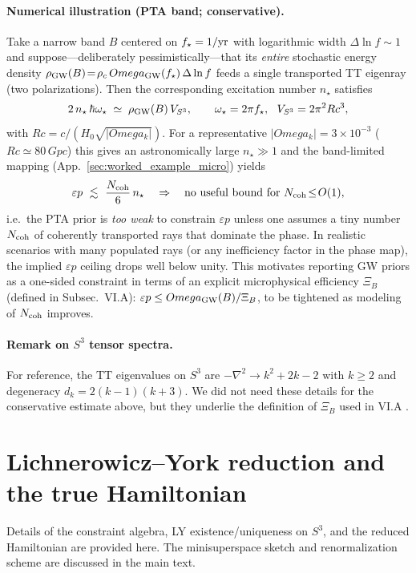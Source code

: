 \documentclass[aps,prd,twocolumn,amsmath,amssymb,nofootinbib,superscriptaddress]{revtex4-2}
\def\mathcal#1{#1}%
\def\mathrm#1{#1}%
\def\Rc{Rc}%
\def\Omega{Omega}\def\sigma{sigma}\def\chi{chi}\def\ell{ell}%
\newcommand{\Rc}{\mathcal{R}_c}
\begin{document}
\paragraph*{Numerical illustration (PTA band; conservative).}
Take a narrow band $B$ centered on $f_\star=1/{\rm yr}$ with logarithmic width $\Delta\ln f\sim 1$ and suppose---deliberately pessimistically---that its \emph{entire} stochastic energy density $\rho_{\rm GW}(B)\!=\!\rho_c \,\Omega_{\rm GW}(f_\star)\,\Delta\ln f$ feeds a single transported TT eigenray (two polarizations). Then the corresponding excitation number $n_\star$ satisfies
\[
  2\,n_\star\,\hbar\omega_\star \;\simeq\; \rho_{\rm GW}(B)\,V_{S^3},\qquad
  \omega_\star=2\pi f_\star,\ \ V_{S^3}=2\pi^2\Rc^3,
\]
with $\Rc=c/(H_0\sqrt{|\Omega_k|})$. For a representative $|\Omega_k|=3\times10^{-3}$ ($\Rc\simeq 80\,\mathrm{Gpc}$) this gives an astronomically large $n_\star\!\gg\!1$ and the band-limited mapping (App.~\ref{sec:worked_example_micro}) yields
\begin{equation}
  \varepsilon p\ \lesssim\ \frac{N_{\rm coh}}{6}\,n_\star \quad\Rightarrow\quad
  \text{no useful bound for }N_{\rm coh}\!\le\!\mathcal{O}(1),
\end{equation}
i.e.\ the PTA prior is \emph{too weak} to constrain $\varepsilon p$ unless one assumes a tiny number $N_{\rm coh}$ of coherently transported rays that dominate the phase. In realistic scenarios with many populated rays (or any inefficiency factor in the phase map), the implied $\varepsilon p$ ceiling drops well below unity. This motivates reporting GW priors as a one-sided constraint in terms of an explicit microphysical efficiency $\Xi_B$ (defined in Subsec.~VI.A): $\varepsilon p \le \Omega_{\rm GW}(B)/\Xi_B$, to be tightened as modeling of $N_{\rm coh}$ improves.

\paragraph*{Remark on $S^3$ tensor spectra.}
For reference, the TT eigenvalues on $S^3$ are $-\nabla^2\to k^2+2k-2$ with $k\ge2$ and degeneracy $d_k=2(k-1)(k+3)$. We did not need these details for the conservative estimate above, but they underlie the definition of $\Xi_B$ used in VI.A \cite{Allen1995_TT_S3}.

\appendix

\section{Lichnerowicz--York reduction and the true Hamiltonian}
Details of the constraint algebra, LY existence/uniqueness on $S^3$, and the reduced Hamiltonian are provided here. The minisuperspace sketch and renormalization scheme are discussed in the main text.
\end{document}
